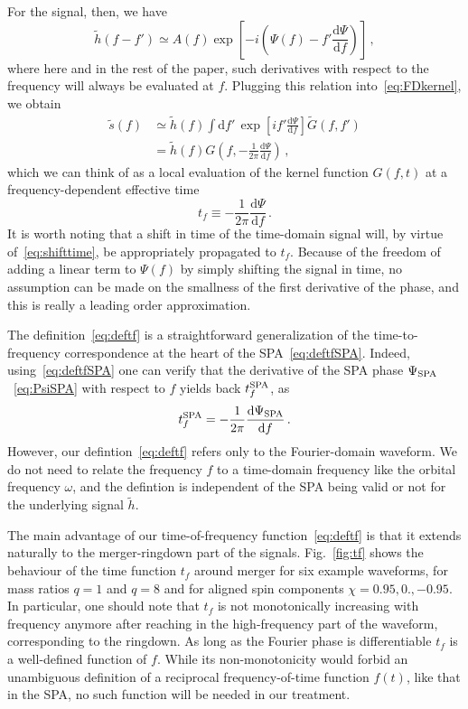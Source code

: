 \documentclass[aps,showpacs,twocolumn,
prd,superscriptaddress,nofootinbib]{revtex4-1}
\newcommand{\be}{\begin{equation}}
\newcommand{\ee}{\end{equation}}
\newcommand\ud{{\mathrm{d}}}
\newcommand{\nn}{\nonumber}
\newcommand{\tf}{t_{f}}
\newcommand{\tfSPA}{t_{f}^{\rm SPA}}
\newcommand{\jgb}[1]{{\color{DarkGreen} #1}}
\begin{document}
For the signal, then, we have
\be
	\tilde{h}(f-f') \simeq A(f) \exp\left[ -i\left( \Psi(f) - f' \frac{\ud \Psi}{\ud f} \right) \right] \,,\label{eq:leadingorderwf}
\ee
where here and in the rest of the paper, such derivatives with respect to the frequency will always be evaluated at $f$. Plugging this relation into~\eqref{eq:FDkernel}, we obtain
\begin{align}
	\tilde{s}(f) &\simeq \tilde{h}(f) \int \ud f' \, \exp\left[ i f' \frac{\ud \Psi}{\ud f} \right] \tilde{G}(f,f') \nn\\
	&= \tilde{h}(f) G\left( f, -\frac{1}{2\pi} \frac{\ud \Psi}{\ud f} \right) \,,\label{eq:leadingorderresponse}
\end{align}
\jgb{which we can think of as a local evaluation of the kernel function $G(f,t)$ at a frequency-dependent effective time}
\be\label{eq:deftf}
	\tf \equiv -\frac{1}{2\pi} \frac{\ud \Psi}{\ud f} \,.
\ee
It is worth noting that a shift in time of the time-domain signal will, by virtue of~\eqref{eq:shifttime}, be appropriately propagated to $t_{f}$. Because of the freedom of adding a linear term to $\Psi(f)$ by simply shifting the signal in time, no assumption can be made on the smallness of the first derivative of the phase, and this is really a leading order approximation.

The definition~\eqref{eq:deftf} is a straightforward generalization of the time-to-frequency correspondence at the heart of the SPA~\eqref{eq:deftfSPA}. Indeed, using~\eqref{eq:deftfSPA} one can verify that the derivative of the SPA phase $\Psi_{\rm SPA}$~\eqref{eq:PsiSPA} with respect to $f$ yields back $\tfSPA$, as
\be\label{eq:tfSPA}
	\tfSPA = -\frac{1}{2\pi} \frac{\ud \Psi_{\rm SPA}}{\ud f} \,.
\ee
However, our defintion~\eqref{eq:deftf} refers only to the Fourier-domain waveform. We do not need to relate the frequency $f$ to a time-domain frequency like the orbital frequency $\omega$, and the defintion is independent of the SPA being valid or not for the underlying signal $\tilde{h}$.

The main advantage of our time-of-frequency function~\eqref{eq:deftf} is that it extends naturally to the merger-ringdown part of the signals. Fig.~\ref{fig:tf} shows the behaviour of the time function $\tf$ around merger for six example waveforms, for mass ratios $q=1$ and $q=8$ and for aligned spin components $\chi=0.95,0.,-0.95$. In particular, one should note that $\tf$ is not monotonically increasing with frequency anymore after reaching in the high-frequency part of the waveform, corresponding to the ringdown. \jgb{As long as the Fourier phase is differentiable $t_{f}$ is a well-defined function of $f$. While its non-monotonicity would forbid an unambiguous definition of a reciprocal frequency-of-time function $f(t)$, like that in the SPA, no such function will be needed in our treatment.}
\end{document}
